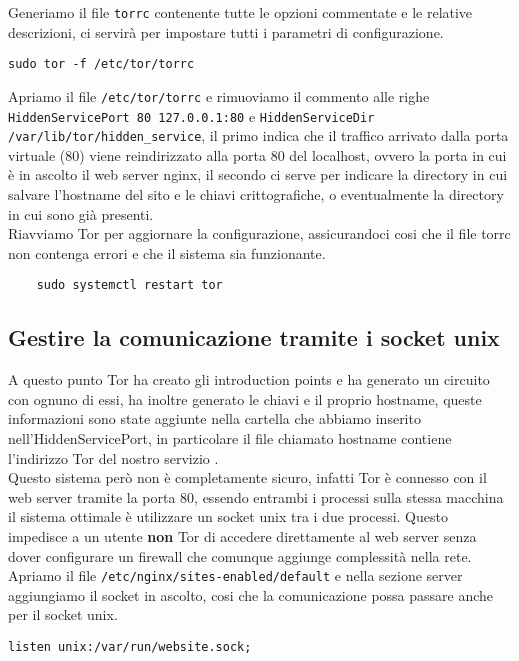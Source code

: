 \cite{TorRepo}

Generiamo il file \lstinline{torrc} contenente tutte le opzioni commentate e le relative descrizioni, ci servirà per impostare tutti i parametri di configurazione. 
\begin{lstlisting}[caption={Generazione file torrc}]
    sudo tor -f /etc/tor/torrc
\end{lstlisting}

Apriamo il file \lstinline{/etc/tor/torrc} e rimuoviamo il commento alle righe \lstinline{HiddenServicePort 80 127.0.0.1:80} e \lstinline{HiddenServiceDir /var/lib/tor/hidden_service}, il primo indica che il traffico arrivato dalla porta virtuale (80) viene reindirizzato alla porta 80 del localhost, ovvero la porta in cui è in ascolto il web server nginx, il secondo ci serve per indicare la directory in cui salvare l'hostname del sito e le chiavi crittografiche, o eventualmente la directory in cui sono già presenti. \\

Riavviamo Tor per aggiornare la configurazione, assicurandoci cosi che il file torrc non contenga errori e che il sistema sia funzionante.
\begin{lstlisting}
    sudo systemctl restart tor
\end{lstlisting}

\subsection{Gestire la comunicazione tramite i socket unix}
A questo punto Tor ha creato gli introduction points e ha generato un circuito con ognuno di essi, ha inoltre generato le chiavi e il proprio hostname, queste informazioni sono state aggiunte nella cartella che abbiamo inserito nell'HiddenServicePort, in particolare il file chiamato hostname contiene l'indirizzo Tor del nostro servizio \cite{SetupOnionService}. \\
Questo sistema però non è completamente sicuro, infatti Tor è connesso con il web server tramite la porta 80, essendo entrambi i processi sulla stessa macchina il sistema ottimale è utilizzare un socket unix tra i due processi. 
Questo impedisce a un utente \textbf{non} Tor di accedere direttamente al web server senza dover configurare un firewall che comunque aggiunge complessità nella rete. \\
Apriamo il file \lstinline{/etc/nginx/sites-enabled/default} e nella sezione server aggiungiamo il socket in ascolto, cosi che la comunicazione possa passare anche per il socket unix.
\begin{lstlisting}[caption={Aggiunta/creazione socket unix}]
    listen unix:/var/run/website.sock;
\end{lstlisting}

